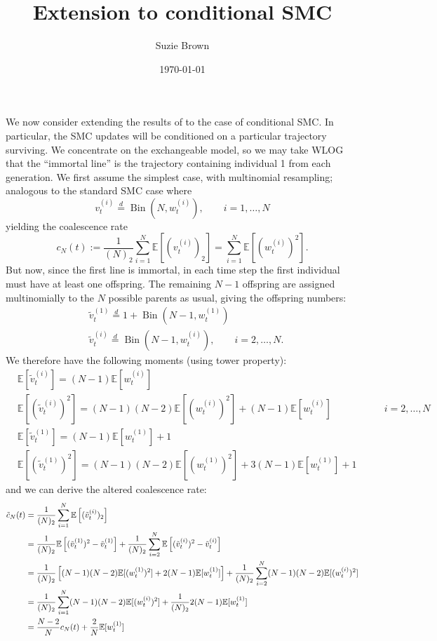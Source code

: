 \documentclass{article}
\title{Extension to conditional SMC}
\author{Suzie Brown}
\date{\today}
\newcommand{\E}{\mathbb{E}}
\newcommand{\vt}[2][t]{v_{#1}^{(#2)}}
\newcommand{\vttilde}[2][t]{\tilde{v}_{#1}^{(#2)}}
\newcommand{\wt}[2][t]{w_{#1}^{(#2)}}
\newcommand{\eqdist}{\overset{d}{=}}
\newcommand{\Bin}{\operatorname{Bin}}
\begin{document}
\maketitle
We now consider extending the results of \citet{koskela2018} to the case of conditional SMC.
In particular, the SMC updates will be conditioned on a particular trajectory surviving. We concentrate on the exchangeable model, so we may take WLOG that the ``immortal line'' is the trajectory containing individual 1 from each generation.
We first assume the simplest case, with multinomial resampling; analogous to the standard SMC case where
\begin{equation*}
\vt{i} \eqdist \Bin (N, \wt{i}), \qquad i=1,\dots,N
\end{equation*}
yielding the coalescence rate
\begin{equation}
c_N(t) := \frac{1}{(N)_2} \sum_{i=1}^{N} \E\left[ (\vt{i})_2 \right] = \sum_{i=1}^{N} \E\left[(\wt{i})^2\right].
\end{equation}
But now, since the first line is immortal, in each time step the first individual must have at least one offspring. The remaining $N-1$ offspring are assigned multinomially to the $N$ possible parents as usual, giving the offspring numbers:
\begin{align*}
& \vttilde{1} \eqdist 1 + \Bin(N-1, \wt{1}) \\
& \vttilde{i} \eqdist \Bin(N-1, \wt{i}), \qquad i=2,\dots,N.
\end{align*}
We therefore have the following moments (using tower property):
\begin{align*}
& \E[\vttilde{i}] = (N-1)\E[\wt{i}] &\\
& \E[(\vttilde{i})^2] = (N-1)(N-2)\E[(\wt{i})^2] + (N-1)\E[\wt{i}] &\qquad i=2,\dots,N \\
& \E[\vttilde{1}] = (N-1)\E[\wt{1}] + 1 \\
& \E[(\vttilde{1})^2] = (N-1)(N-2)\E[(\wt{1})^2] + 3(N-1)\E[\wt{1}] + 1 &
\end{align*}
and we can derive the altered coalescence rate:
\begin{align}
\tilde{c}_N(t) &= \frac{1}{(N)_2} \sum_{i=1}^{N} \E\left[ (\vttilde{i})_2 \right] \notag\\
&= \frac{1}{(N)_2} \E\left[ (\vttilde{1})^2 - \vttilde{1} \right] + \frac{1}{(N)_2}\sum_{i=2}^{N} \E\left[ (\vttilde{i})^2 - \vttilde{i} \right] \notag\\
&= \frac{1}{(N)_2}\left[ (N-1)(N-2)\E[(\wt{1})^2] + 2(N-1)\E[\wt{1}] \right] + \frac{1}{(N)_2} \sum_{i=2}^{N} (N-1)(N-2)\E[(\wt{i})^2] \notag\\
&= \frac{1}{(N)_2} \sum_{i=1}^{N} (N-1)(N-2)\E[(\wt{i})^2] + \frac{1}{(N)_2} 2(N-1)\E[\wt{1}] \notag\\
&= \frac{N-2}{N} c_N(t) + \frac{2}{N} \E[\wt{1}]
\end{align}
\end{document}
